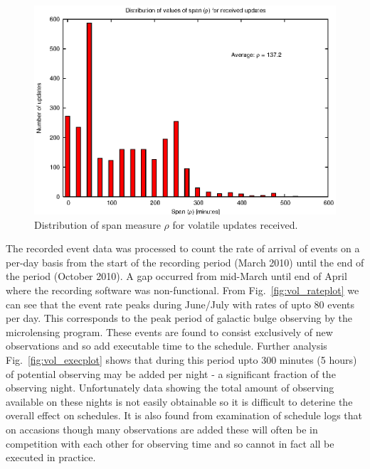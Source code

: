 \begin{figure}[htbp]
\begin{center}
    \includegraphics[scale=1.0, angle=0]{figures/vol_span.eps}
\end{center}
\caption[Distribution of span measure $\rho$ for volatile updates received.]
{Distribution of span measure $\rho$ for volatile updates received.}
\label{fig:vol_spandist}
\end{figure}


The recorded event data was processed to count the rate of arrival of events on a per-day basis from the start of the recording period (March 2010) until the end of the period (October 2010). A gap occurred from mid-March until end of April where the recording software was non-functional. From Fig.~\ref{fig:vol_rateplot} we can see that the event rate peaks during June/July with rates of upto 80 events per day. This corresponds to the peak period of galactic bulge observing by the microlensing program. These events are found to consist exclusively of new observations and so add executable time to the schedule. Further analysis Fig.~\ref{fig:vol_execplot} shows that during this period upto 300 minutes (5 hours) of potential observing may be added per night - a significant fraction of the observing night. Unfortunately data showing the total amount of observing available on these nights is not easily obtainable so it is difficult to deterine the overall effect on schedules. It is also found from examination of schedule logs that on accasions though many observations are added these will often be in competition with each other for observing time and so cannot in fact all be executed in practice.


